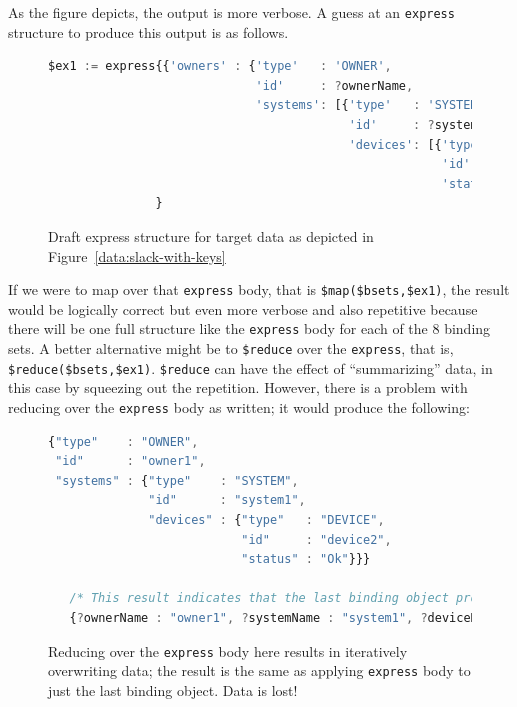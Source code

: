 \documentclass[10pt,letterpaper]{article} %
\newcommand{\stt}[1]{\texttt{#1}} %
\begin{document}
As the figure depicts, the output is more verbose. %
A guess at an \stt{express} structure to produce this output is as follows.
\begin{figure}[H]
  \caption{Draft express structure for target data as depicted in Figure~\ref{data:slack-with-keys}}
 \label{code:slack-possible-express}
\begin{lstlisting}[language=JavaScript,basicstyle=\ttfamily\scriptsize,numberstyle=\scriptsize]
$ex1 := express{{'owners' : {'type'   : 'OWNER',
                             'id'     : ?ownerName,
                             'systems': [{'type'   : 'SYSTEM',
                                          'id'     : ?systemName,
                                          'devices': [{'type'  : 'DEVICE',
                                                       'id'    : ?deviceName,
                                                       'status': ?status}]}]}}
               }
\end{lstlisting}
\end{figure}  \vspace{-3em}

If we were to map over that \stt{express} body, that is \stt{\$map(\$bsets,\$ex1)}, the result would be logically correct but even more verbose and also repetitive because there will be one full structure like the \stt{express} body for each of the 8 binding sets.
A better alternative might be to \stt{\$reduce} over the \stt{express}, that is, \stt{\$reduce(\$bsets,\$ex1)}.
\stt{\$reduce} can have the effect of ``summarizing'' data, in this case by squeezing out the repetition.
However, there is a problem with reducing over the \stt{express} body as written;
it would produce the following:

\begin{figure}[H]
  \caption{Reducing over the \stt{express} body here results in iteratively overwriting data; the result is
    the same as applying \stt{express} body to just the last binding object. Data is lost!}
 \label{code:slack-result-wo-keys}
\begin{lstlisting}[language=JavaScript,basicstyle=\ttfamily\scriptsize,numberstyle=\scriptsize]
{"type"    : "OWNER",
 "id"      : "owner1",
 "systems" : {"type"    : "SYSTEM",
              "id"      : "system1",
              "devices" : {"type"   : "DEVICE",
                           "id"     : "device2",
                           "status" : "Ok"}}}

   /* This result indicates that the last binding object processed was the following */
   {?ownerName : "owner1", ?systemName : "system1", ?deviceName : "device2", ?status : "Ok", ?id : 200}
\end{lstlisting}
\end{figure}  \vspace{-3em}
\end{document}
